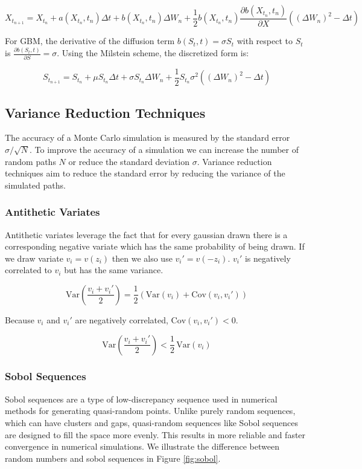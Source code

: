 \documentclass{article}
\begin{document}
\[
X_{t_{n+1}} = X_{t_n} + a(X_{t_n}, t_n) \Delta t + b(X_{t_n}, t_n) \Delta W_n + \frac{1}{2} b(X_{t_n}, t_n) \frac{\partial b(X_{t_n}, t_n)}{\partial X} \left( (\Delta W_n)^2 - \Delta t \right)
\]

For GBM, the derivative of the diffusion term $b(S_t, t) = \sigma S_t$ with respect to $S_t$ is $\frac{\partial b(S_t, t)}{\partial S} = \sigma$. Using the Milstein scheme, the discretized form is:

\[
S_{t_{n+1}} = S_{t_n} + \mu S_{t_n} \Delta t + \sigma S_{t_n} \Delta W_n + \frac{1}{2} S_{t_n} \sigma^2 \left( (\Delta W_n)^2 - \Delta t \right)
\]

\newpage
\subsection{Variance Reduction Techniques}

The accuracy of a Monte Carlo simulation is measured by the standard error $\sigma / \sqrt{N}$. To improve the accuracy of a simulation we can increase the number 
of random paths $N$ or reduce the standard deviation $\sigma$. Variance reduction techniques aim to reduce the standard error by reducing the variance of the simulated paths.

\subsubsection{Antithetic Variates}

Antithetic variates leverage the fact that for every gaussian drawn there is a corresponding negative variate which 
has the same probability of being drawn. If we draw variate $v_i = v(z_i)$ then we also use $v_i' = v(-z_i)$. $v_i'$ 
is negatively correlated to $v_i$ but has the same variance.\cite{jackel}

\[
\text{Var}\left( \frac{v_i + v_i'}{2} \right) = \frac{1}{2} \left( \text{Var}(v_i) + \text{Cov}(v_i, v_i') \right)
\]

Because $v_i$ and $v_i'$ are negatively correlated, $\text{Cov}(v_i, v_i') < 0$.

\[
\text{Var}\left( \frac{v_i + v_i'}{2} \right) < \frac{1}{2} \, \text{Var}(v_i)
\]

\subsubsection{Sobol Sequences}

Sobol sequences are a type of low-discrepancy sequence used in numerical methods for generating quasi-random points. 
Unlike purely random sequences, which can have clusters and gaps, quasi-random sequences like Sobol sequences are designed 
to fill the space more evenly. This results in more reliable and faster convergence in numerical simulations. We illustrate 
the difference between random numbers and sobol sequences in Figure \ref{fig:sobol}.
\end{document}
